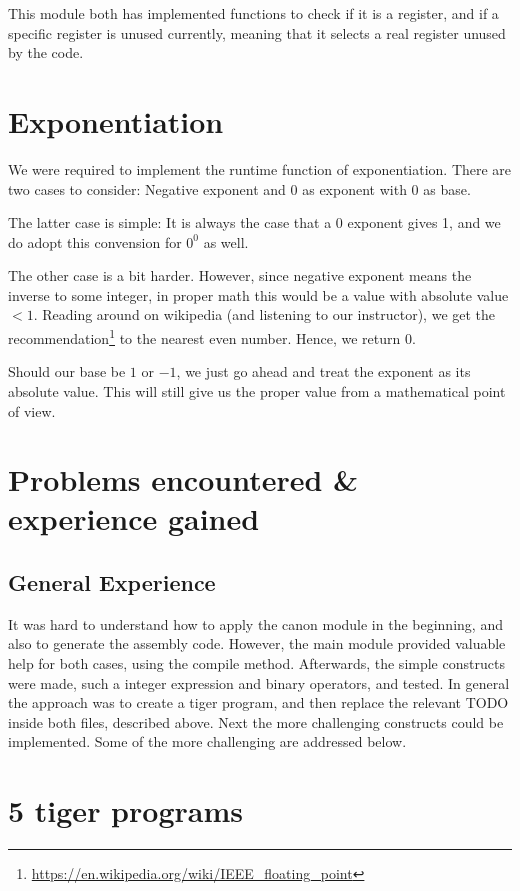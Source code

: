 \documentclass{article}
\begin{document}
This module both has implemented functions to check if it is a register, and if a specific register is unused currently, meaning that it selects a real register unused by the code.

\section{Exponentiation}
We were required to implement the runtime function of exponentiation. There are two cases to consider: Negative exponent and 0 as exponent with 0 as base.

The latter case is simple: It is always the case that a 0 exponent gives 1, and we do adopt this convension for $0^0$ as well.

The other case is a bit harder. However, since negative exponent means the inverse to some integer, in proper math this would be a value with absolute value $ < 1$. Reading around on wikipedia (and listening to our instructor), we get the recommendation\footnote{\url{https://en.wikipedia.org/wiki/IEEE_floating_point}} to the nearest even number. Hence, we return 0.

Should our base be $1$ or $-1$, we just go ahead and treat the exponent as its absolute value. This will still give us the proper value from a mathematical point of view.

\section{Problems encountered \& experience gained}

\subsection{General Experience}
It was hard to understand how to apply the canon module in the beginning, and also to generate the assembly code. However, the main module provided valuable help for both cases, using the compile method. Afterwards, the simple constructs were made, such a integer expression and binary operators, and tested. In general the approach was to create a tiger program, and then replace the relevant TODO inside both files, described above.
Next the more challenging constructs could be implemented. Some of the more challenging are addressed below.  

\section{5 tiger programs}
\end{document}
